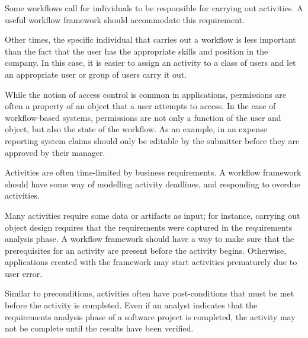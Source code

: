 Some workflows call for individuals to be responsible for carrying out activities. A useful workflow framework should accommodate this requirement.


Other times, the specific individual that carries out a workflow is less important than the fact that the user has the appropriate skills and position in the company. In this case, it is easier to assign an activity to a class of users and let an appropriate user or group of users carry it out.

While the notion of access control is common in applications, permissions are often a property of an object that a user attempts to access. In the case of workflow-based systems, permissions are not only a function of the user and object, but also the state of the workflow. As an example, in an expense reporting system claims should only be editable by the submitter before they are approved by their manager.


Activities are often time-limited by business requirements. A workflow framework should have some way of modelling activity deadlines, and responding to overdue activities.


Many activities require some data or artifacts as input; for instance, carrying out object design requires that the requirements were captured in the requirements analysis phase. A workflow framework should have a way to make sure that the prerequisites for an activity are present before the activity begins. Otherwise, applications created with the framework may start activities prematurely due to user error.


Similar to preconditions, activities often have post-conditions that must be met before the activity is completed. Even if an analyst indicates that the requirements analysis phase of a software project is completed, the activity may not be complete until the results have been verified.


